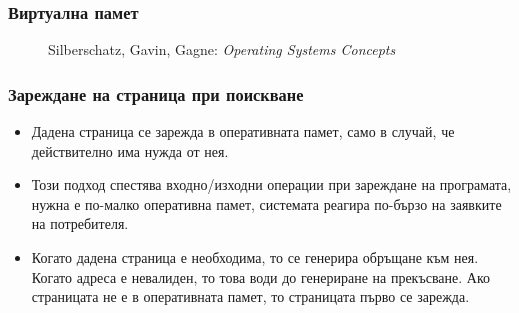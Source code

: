 \documentclass[ignorenonframetext, hyperref=unicode]{beamer}
\begin{document}
\begin{frame}
\frametitle{Виртуална памет}
\begin{figure}[h]
\center
{}
\caption{Silberschatz, Gavin, Gagne: {\em Operating Systems Concepts}}
\end{figure}
\end{frame}

\begin{frame}
\frametitle{Зареждане на страница при поискване}
\begin{itemize}
  \item Дадена страница се зарежда в оперативната памет, само в случай, че
  действително има нужда от нея.
  \item Този подход спестява входно/изходни операции при зареждане на
  програмата, нужна е по-малко оперативна памет, системата реагира по-бързо на
  заявките на потребителя.
  \item Когато дадена страница е необходима, то се генерира обръщане към нея.
  Когато адреса е невалиден, то това води до генериране на прекъсване. Ако
  страницата не е в оперативната памет, то страницата първо се зарежда.
\end{itemize}
\end{frame}
\end{document}

